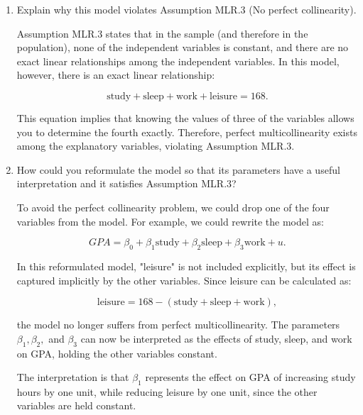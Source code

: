 \documentclass[12pt]{article}
\begin{document}
\begin{enumerate}
{\begin{enumerate}
    No, it does not make sense to hold sleep, work, and leisure fixed while changing study. The reason is that the sum of all four activities must be 168 hours for each student. If sleep, work, and leisure are fixed, any increase in study hours must be compensated by a decrease in at least one of the other activities. In other words, these variables are not independent: they are perfectly correlated in a way that the sum is constant.

    \item Explain why this model violates Assumption MLR.3 (No perfect collinearity).

    Assumption MLR.3 states that in the sample (and therefore in the population), none of the independent variables is constant, and there are no exact linear relationships among the independent variables. In this model, however, there is an exact linear relationship:

    \[
    \text{study} + \text{sleep} + \text{work} + \text{leisure} = 168.
    \]

    This equation implies that knowing the values of three of the variables allows you to determine the fourth exactly. Therefore, perfect multicollinearity exists among the explanatory variables, violating Assumption MLR.3.

    \item How could you reformulate the model so that its parameters have a useful interpretation and it satisfies Assumption MLR.3?

    To avoid the perfect collinearity problem, we could drop one of the four variables from the model. For example, we could rewrite the model as:

    \[
    GPA = \beta_0 + \beta_1 \text{study} + \beta_2 \text{sleep} + \beta_3 \text{work} + u.
    \]

    In this reformulated model, "leisure" is not included explicitly, but its effect is captured implicitly by the other variables. Since leisure can be calculated as:

    \[
    \text{leisure} = 168 - (\text{study} + \text{sleep} + \text{work}),
    \]

    the model no longer suffers from perfect multicollinearity. The parameters \( \beta_1, \beta_2, \) and \( \beta_3 \) can now be interpreted as the effects of study, sleep, and work on GPA, holding the other variables constant.

    The interpretation is that \( \beta_1 \) represents the effect on GPA of increasing study hours by one unit, while reducing leisure by one unit, since the other variables are held constant.
\end{enumerate}
}


\end{enumerate}
\end{document}
